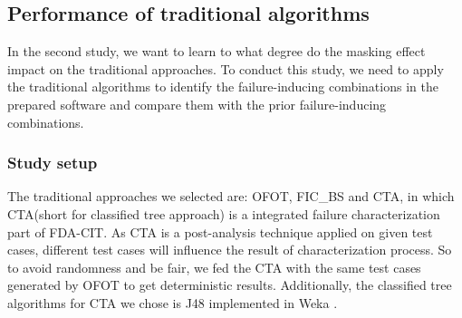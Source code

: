 \documentclass{sig-alternate}
\begin{document}
\subsection{Performance of traditional algorithms}
In the second study, we want to learn to what degree do the masking effect impact on the traditional approaches. To conduct this study, we need to apply the traditional algorithms to identify the failure-inducing combinations in the prepared software and compare them with the prior failure-inducing combinations.

%


\subsubsection{Study setup}
The traditional approaches we selected are: OFOT\cite{nie2011minimal}, FIC\_BS \cite{zhang2011characterizing} and CTA\cite{yilmaz2006covering}, in which CTA(short for classified tree approach) is a integrated failure characterization part of FDA-CIT\cite{yilmaz2013reducing}. As CTA is a post-analysis technique applied on given test cases, different test cases will influence the result of characterization process. So to avoid randomness and be fair, we fed the CTA with the same test cases generated by OFOT to get deterministic results. Additionally, the classified tree algorithms for CTA we chose is J48 implemented in Weka \cite{hall2009weka}. %
\end{document}
